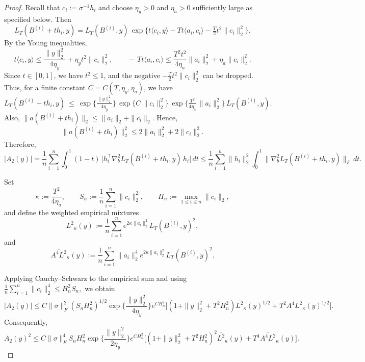 \documentclass[11pt]{article}
\theoremstyle{definition}
\begin{document}
\begin{proof}
{
Recall that $c_i:=\sigma^{-1}h_i$ and choose
$\eta_y>0$ and $\eta_a>0$ sufficiently large as specified below.
Then
}
\[
L_T(B^{(i)}+t h_i,y)
= L_T(B^{(i)},y)\,\exp\!\Big\{t\langle c_i,y\rangle - Tt\langle a_i,c_i\rangle - \tfrac{T}{2}t^2\|c_i\|_2^2\Big\}.
\]
By the Young inequalities,
\[
t\langle c_i,y\rangle \le \frac{\|y\|_2^2}{4\eta_y} + \eta_y t^2\|c_i\|_2^2,
\qquad
-\,Tt\langle a_i,c_i\rangle
\le \frac{T^2 t^2}{4\eta_a}\|a_i\|_2^2+\eta_a\|c_i\|_2^2.
\]
{
Since $t\in[0,1]$, we have $t^2\le1$, and the negative
$-\tfrac{T}{2}t^2\|c_i\|_2^2$ can be dropped. Thus, for a finite
constant $C=C(T,\eta_y,\eta_a)$, we have
}
$$L_T(B^{(i)}+t h_i,y)
\ \le\ \exp\!\Big\{\tfrac{\|y\|_2^2}{4\eta_y}\Big\}\,
\exp\!\Big\{C\,\|c_i\|_2^2\Big\}\,
\exp\!\Big\{\tfrac{T^2}{4\eta_a}\,\|a_i\|_2^2\Big\}\,
L_T(B^{(i)},y).$$
Also, $\|a(B^{(i)}+t h_i)\|_2 \le \|a_i\|_2+\|c_i\|_2$. Hence,
$$
\|a(B^{(i)}+t h_i)\|_2^2 \le 2\|a_i\|_2^2+2\|c_i\|_2^2.
$$
Therefore,
\[
|A_2(y)|
=\frac1n\sum_{i=1}^n\int_0^1 (1-t)\,\big|h_i^\top\nabla_b^2 L_T(B^{(i)}+t h_i,y)\,h_i\big|\,dt
\le \frac1n\sum_{i=1}^n \|h_i\|_2^2\int_0^1 \big\|\nabla_b^2 L_T(B^{(i)}+t h_i,y)\big\|_F\,dt.
\]
{
Set
\[
\kappa:=\frac{T^2}{4\eta_a},\qquad
S_n:=\frac1n\sum_{i=1}^n\|c_i\|_2^2,\qquad
H_n:=\max_{1\le i\le n}\|c_i\|_2,
\]
and define the weighted empirical mixtures
\[
\overline{L^2}_{\kappa}(y)
:=
\frac1n\sum_{i=1}^n
e^{2\kappa\|a_i\|_2^2}L_T(B^{(i)},y)^2,
\]
and
\[
\overline{A^4L^2}_{\kappa}(y)
:=
\frac1n\sum_{i=1}^n
\|a_i\|_2^4
e^{2\kappa\|a_i\|_2^2}L_T(B^{(i)},y)^2.
\]

Applying Cauchy--Schwarz to the empirical sum and using $\frac1n\sum_{i=1}^n\|c_i\|_2^4
\le H_n^2S_n,$
we obtain
\[
|A_2(y)|
\le
C\|\sigma\|_F^2(S_nH_n^2)^{1/2}
\exp\!\Big\{\frac{\|y\|_2^2}{4\eta_y}\Big\}
e^{CH_n^2}
\Big[
(1+\|y\|_2^2+T^2H_n^2)
\overline{L^2}_{\kappa}(y)^{1/2}
+
T^2\overline{A^4L^2}_{\kappa}(y)^{1/2}
\Big].
\]
Consequently,
\[
A_2(y)^2
\le
C\|\sigma\|_F^4S_nH_n^2
\exp\!\Big\{\frac{\|y\|_2^2}{2\eta_y}\Big\}
e^{CH_n^2}
\Big[
(1+\|y\|_2^2+T^2H_n^2)^2
\overline{L^2}_{\kappa}(y)
+
T^4\overline{A^4L^2}_{\kappa}(y)
\Big].
\]
}


\end{proof}
\end{document}
